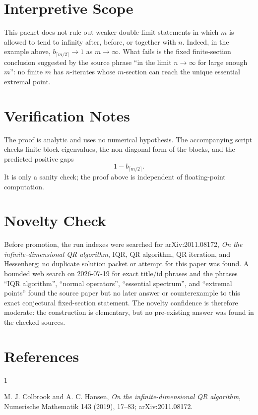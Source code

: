 \documentclass[11pt]{article}
\begin{document}
\section*{Interpretive Scope}

This packet does not rule out weaker double-limit statements in which \(m\) is
allowed to tend to infinity after, before, or together with \(n\).  Indeed, in
the example above, \(b_{\lceil m/2\rceil}\to1\) as \(m\to\infty\).  What fails is
the fixed finite-section conclusion suggested by the source phrase
``in the limit \(n\to\infty\) for large enough \(m\)'': no finite \(m\) has
\(n\)-iterates whose \(m\)-section can reach the unique essential extremal point.

\section*{Verification Notes}

The proof is analytic and uses no numerical hypothesis.  The accompanying
script  checks finite block
eigenvalues, the non-diagonal form of the blocks, and the predicted positive gaps
\[
  1-b_{\lceil m/2\rceil}.
\]
It is only a sanity check; the proof above is independent of floating-point
computation.

\section*{Novelty Check}

Before promotion, the run indexes were searched for arXiv:2011.08172,
\emph{On the infinite-dimensional QR algorithm}, IQR, QR algorithm, QR
iteration, and Hessenberg; no duplicate solution packet or attempt for this
paper was found.  A bounded web search on 2026-07-19 for exact title/id phrases
and the phrases ``IQR algorithm'', ``normal operators'', ``essential spectrum'',
and ``extremal points'' found the source paper but no later answer or
counterexample to this exact conjectural fixed-section statement.  The novelty
confidence is therefore moderate: the construction is elementary, but no
pre-existing answer was found in the checked sources.

\section*{References}

\begin{thebibliography}{1}

M. J. Colbrook and A. C. Hansen,
\emph{On the infinite-dimensional QR algorithm},
Numerische Mathematik 143 (2019), 17--83; arXiv:2011.08172.

\end{thebibliography}
\end{document}
